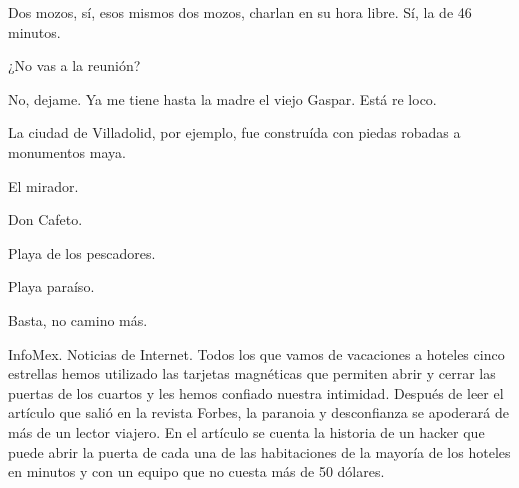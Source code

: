 \documentclass[12pt,twoside,openright,a5paper]{book}
\begin{document}
\vspace{0.5cm}
\hrulefill\hspace{0.2cm} \decofourleft\decofourright \hspace{0.2cm} \hrulefill
\vspace{0.5cm}

Dos mozos, sí, esos mismos dos mozos, charlan en su hora libre. Sí, la de
46 minutos.

¿No vas a la reunión?

No, dejame. Ya me tiene hasta la madre el viejo Gaspar. Está re loco.


\vspace{0.5cm}
\hrulefill\hspace{0.2cm} \decofourleft\decofourright \hspace{0.2cm} \hrulefill
\vspace{0.5cm}

La ciudad de Villadolid, por ejemplo, 
fue construída con piedas robadas a monumentos maya.


\afterpage{}
\vspace{0.5cm}
\hrulefill\hspace{0.2cm} \decofourleft\decofourright \hspace{0.2cm} \hrulefill
\vspace{0.5cm}

El mirador.

Don Cafeto.

Playa de los pescadores.

Playa paraíso.

Basta, no camino más.


\vspace{0.5cm}
\hrulefill\hspace{0.2cm} \decofourleft\decofourright \hspace{0.2cm} \hrulefill
\vspace{0.5cm}

InfoMex. Noticias de Internet. Todos los que vamos de vacaciones a hoteles
cinco estrellas hemos utilizado las tarjetas magnéticas que permiten
abrir y cerrar las puertas de los cuartos y les hemos confiado nuestra
intimidad. Después de leer el artículo que salió en la revista Forbes,
la paranoia y desconfianza se apoderará de más de un lector viajero. En
el artículo se cuenta la historia de un hacker que puede abrir la puerta
de cada una de las habitaciones de la mayoría de los hoteles en minutos
y con un equipo que no cuesta más de 50 dólares.
\end{document}
